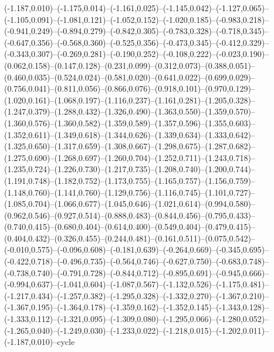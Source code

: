 \documentclass[10pt]{article}
\begin{document}
(-1.187,0.010)--(-1.175,0.014)--(-1.161,0.025)--(-1.145,0.042)--(-1.127,0.065)--(-1.105,0.091)--(-1.081,0.121)--(-1.052,0.152)--(-1.020,0.185)--(-0.983,0.218)--(-0.941,0.249)--(-0.894,0.279)--(-0.842,0.305)--(-0.783,0.328)--(-0.718,0.345)--(-0.647,0.356)--(-0.568,0.360)--(-0.525,0.356)--(-0.473,0.345)--(-0.412,0.329)--(-0.343,0.307)--(-0.269,0.281)--(-0.190,0.252)--(-0.108,0.222)--(-0.023,0.190)--(0.062,0.158)--(0.147,0.128)--(0.231,0.099)--(0.312,0.073)--(0.388,0.051)--(0.460,0.035)--(0.524,0.024)--(0.581,0.020)--(0.641,0.022)--(0.699,0.029)--(0.756,0.041)--(0.811,0.056)--(0.866,0.076)--(0.918,0.101)--(0.970,0.129)--(1.020,0.161)--(1.068,0.197)--(1.116,0.237)--(1.161,0.281)--(1.205,0.328)--(1.247,0.379)--(1.288,0.432)--(1.326,0.490)--(1.363,0.550)--(1.359,0.570)--(1.360,0.576)--(1.360,0.582)--(1.359,0.589)--(1.357,0.596)--(1.355,0.603)--(1.352,0.611)--(1.349,0.618)--(1.344,0.626)--(1.339,0.634)--(1.333,0.642)--(1.325,0.650)--(1.317,0.659)--(1.308,0.667)--(1.298,0.675)--(1.287,0.682)--(1.275,0.690)--(1.268,0.697)--(1.260,0.704)--(1.252,0.711)--(1.243,0.718)--(1.235,0.724)--(1.226,0.730)--(1.217,0.735)--(1.208,0.740)--(1.200,0.744)--(1.191,0.748)--(1.182,0.752)--(1.173,0.755)--(1.165,0.757)--(1.156,0.759)--(1.148,0.760)--(1.141,0.760)--(1.129,0.756)--(1.116,0.745)--(1.101,0.727)--(1.085,0.704)--(1.066,0.677)--(1.045,0.646)--(1.021,0.614)--(0.994,0.580)--(0.962,0.546)--(0.927,0.514)--(0.888,0.483)--(0.844,0.456)--(0.795,0.433)--(0.740,0.415)--(0.680,0.404)--(0.614,0.400)--(0.549,0.404)--(0.479,0.415)--(0.404,0.432)--(0.326,0.455)--(0.244,0.481)--(0.161,0.511)--(0.075,0.542)--(-0.010,0.575)--(-0.096,0.608)--(-0.181,0.639)--(-0.264,0.669)--(-0.345,0.695)--(-0.422,0.718)--(-0.496,0.735)--(-0.564,0.746)--(-0.627,0.750)--(-0.683,0.748)--(-0.738,0.740)--(-0.791,0.728)--(-0.844,0.712)--(-0.895,0.691)--(-0.945,0.666)--(-0.994,0.637)--(-1.041,0.604)--(-1.087,0.567)--(-1.132,0.526)--(-1.175,0.481)--(-1.217,0.434)--(-1.257,0.382)--(-1.295,0.328)--(-1.332,0.270)--(-1.367,0.210)--(-1.367,0.195)--(-1.364,0.178)--(-1.359,0.162)--(-1.352,0.145)--(-1.343,0.128)--(-1.333,0.112)--(-1.321,0.095)--(-1.309,0.080)--(-1.295,0.066)--(-1.280,0.052)--(-1.265,0.040)--(-1.249,0.030)--(-1.233,0.022)--(-1.218,0.015)--(-1.202,0.011)--(-1.187,0.010)--cycle 
\end{document}

